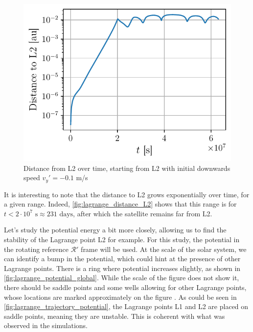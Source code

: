 \begin{figure}
    \vspace*{-0.4cm}
    \centering
    \includegraphics[width=\linewidth]{figures/lagrange_exponential_distance.pdf}
    \caption{Distance from L2 over time, starting from L2 with initial downwards speed \(v_y' = -0.1\) m/s}
    \label{fig:lagrange_distance_L2}
    \vspace*{-0.5cm}
\end{figure}
It is interesting to note that the distance to L2 grows exponentially over time, for a given range. Indeed, \autoref{fig:lagrange_distance_L2} shows that this range is for \(t < 2 \cdot 10^7 \textrm{ s} \approx 231 \textrm{ days}\), after which the satellite remains far from L2.

Let's study the potential energy a bit more closely, allowing us to find the stability of the Lagrange point L2 for example. For this study, the potential in the rotating reference \(\mathcal R'\) frame will be used. At the scale of the solar system, we can identify a bump in the potential, which could hint at the presence of other Lagrange points. There is a ring where potential increases slightly, as shown in \autoref{fig:lagrange_potential_global}. While the scale of the figure does not show it, there should be saddle points and some wells allowing for other Lagrange points, whose locations are marked approximately on the figure \cite{lagrange}. As could be seen in \autoref{fig:lagrange_trajectory_potential}, the Lagrange points L1 and L2 are placed on saddle points, meaning they are unstable. This is coherent with what was observed in the simulations.

